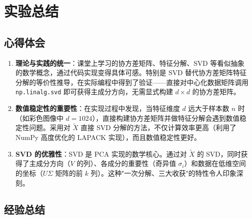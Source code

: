 \documentclass[a4paper]{article}
\begin{document}
\section{实验总结}

\subsection{心得体会}

\begin{enumerate}
    \item \textbf{理论与实践的统一}：课堂上学习的协方差矩阵、特征分解、SVD 等看似抽象的数学概念，通过代码实现变得具体可感。特别是 SVD 替代协方差矩阵特征分解的等价性推导，在实际编程中得到了验证——直接对中心化数据矩阵调用 \texttt{np.linalg.svd} 即可获得主成分方向，无需显式构建 $d \times d$ 的协方差矩阵。

    \item \textbf{数值稳定性的重要性}：在实现过程中发现，当特征维度 $d$ 远大于样本数 $n$ 时（如彩色图像中 $d=1024$），直接构建协方差矩阵并做特征分解会遇到数值稳定性问题。采用对 $\tilde{X}$ 直接 SVD 分解的方法，不仅计算效率更高（利用了 NumPy 高度优化的 LAPACK 实现），而且数值稳定性更好。

    \item \textbf{SVD 的优雅性}：SVD 是 PCA 实现的数学核心。通过对 $\tilde{X}$ 的 SVD，同时获得了主成分方向（$V$ 的列）、各成分的重要性（奇异值 $\sigma_i$）和数据在低维空间的坐标（$U\Sigma$ 矩阵的前 $k$ 列）。这种"一次分解、三大收获"的特性令人印象深刻。
\end{enumerate}

\subsection{经验总结}
\end{document}
